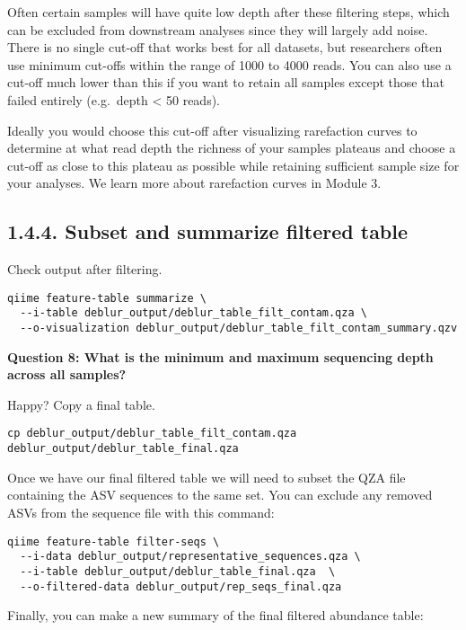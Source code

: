 \documentclass[
]{book}
\begin{document}
Often certain samples will have quite low depth after these filtering steps, which can be excluded from downstream analyses since they will largely add noise. There is no single cut-off that works best for all datasets, but researchers often use minimum cut-offs within the range of 1000 to 4000 reads. You can also use a cut-off much lower than this if you want to retain all samples except those that failed entirely (e.g.~depth \textless{} 50 reads).

Ideally you would choose this cut-off after visualizing rarefaction curves to determine at what read depth the richness of your samples plateaus and choose a cut-off as close to this plateau as possible while retaining sufficient sample size for your analyses. We learn more about rarefaction curves in Module 3.

\subsection{1.4.4. Subset and summarize filtered table}\label{subset-and-summarize-filtered-table}

Check output after filtering.

\begin{verbatim}
qiime feature-table summarize \
  --i-table deblur_output/deblur_table_filt_contam.qza \
  --o-visualization deblur_output/deblur_table_filt_contam_summary.qzv
\end{verbatim}

\textbf{Question 8: What is the minimum and maximum sequencing depth across all samples?}

Happy? Copy a final table.

\begin{verbatim}
cp deblur_output/deblur_table_filt_contam.qza deblur_output/deblur_table_final.qza
\end{verbatim}

Once we have our final filtered table we will need to subset the QZA file containing the ASV sequences to the same set. You can exclude any removed ASVs from the sequence file with this command:

\begin{verbatim}
qiime feature-table filter-seqs \
  --i-data deblur_output/representative_sequences.qza \
  --i-table deblur_output/deblur_table_final.qza  \
  --o-filtered-data deblur_output/rep_seqs_final.qza
\end{verbatim}

Finally, you can make a new summary of the final filtered abundance table:
\end{document}
